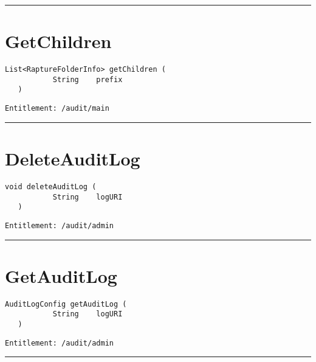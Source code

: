 \rule{12cm}{2pt}
\section{GetChildren}
\label{Api:GetChildren}
\begin{lstlisting}[style=nonumbers]
   List<RaptureFolderInfo> getChildren (
           String    prefix
   )
\end{lstlisting}
\begin{Verbatim}[formatcom=\color{Maroon}]
  Entitlement: /audit/main
\end{Verbatim}



\rule{12cm}{2pt}
\section{DeleteAuditLog}
\label{Api:DeleteAuditLog}
\begin{lstlisting}[style=nonumbers]
   void deleteAuditLog (
           String    logURI
   )
\end{lstlisting}
\begin{Verbatim}[formatcom=\color{Maroon}]
  Entitlement: /audit/admin
\end{Verbatim}



\rule{12cm}{2pt}
\section{GetAuditLog}
\label{Api:GetAuditLog}
\begin{lstlisting}[style=nonumbers]
   AuditLogConfig getAuditLog (
           String    logURI
   )
\end{lstlisting}
\begin{Verbatim}[formatcom=\color{Maroon}]
  Entitlement: /audit/admin
\end{Verbatim}



\rule{12cm}{2pt}
